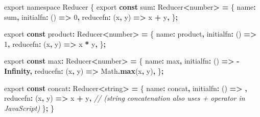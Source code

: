 \documentclass[
  openany]{book}
\newenvironment{Shaded}{\begin{snugshade}}{\end{snugshade}}
\newcommand{\BuiltInTok}[1]{#1}
\newcommand{\CommentTok}[1]{\textcolor[rgb]{0.56,0.35,0.01}{\textit{#1}}}
\newcommand{\DataTypeTok}[1]{\textcolor[rgb]{0.13,0.29,0.53}{#1}}
\newcommand{\DecValTok}[1]{\textcolor[rgb]{0.00,0.00,0.81}{#1}}
\newcommand{\FunctionTok}[1]{\textcolor[rgb]{0.13,0.29,0.53}{\textbf{#1}}}
\newcommand{\ImportTok}[1]{#1}
\newcommand{\KeywordTok}[1]{\textcolor[rgb]{0.13,0.29,0.53}{\textbf{#1}}}
\newcommand{\NormalTok}[1]{#1}
\newcommand{\OperatorTok}[1]{\textcolor[rgb]{0.81,0.36,0.00}{\textbf{#1}}}
\newcommand{\VerbatimStringTok}[1]{\textcolor[rgb]{0.31,0.60,0.02}{#1}}
\theoremstyle{definition}
\theoremstyle{definition}
\theoremstyle{definition}
\theoremstyle{definition}
\theoremstyle{remark}
\begin{document}
\begin{Shaded}
\begin{Highlighting}[]
\ImportTok{export} \ImportTok{namespace} \DataTypeTok{Reducer}\NormalTok{ \{}
  \ImportTok{export} \KeywordTok{const}\NormalTok{ sum}\OperatorTok{:}\NormalTok{ Reducer}\OperatorTok{\textless{}}\DataTypeTok{number}\OperatorTok{\textgreater{}} \OperatorTok{=}\NormalTok{ \{}
\NormalTok{    name}\OperatorTok{:} \VerbatimStringTok{\textasciigrave{}sum\textasciigrave{}}\OperatorTok{,}
\NormalTok{    initialfn}\OperatorTok{:}\NormalTok{ () }\KeywordTok{=\textgreater{}} \DecValTok{0}\OperatorTok{,}
\NormalTok{    reducefn}\OperatorTok{:}\NormalTok{ (x}\OperatorTok{,}\NormalTok{ y) }\KeywordTok{=\textgreater{}}\NormalTok{ x }\OperatorTok{+}\NormalTok{ y}\OperatorTok{,}
\NormalTok{  \}}\OperatorTok{;}

  \ImportTok{export} \KeywordTok{const}\NormalTok{ product}\OperatorTok{:}\NormalTok{ Reducer}\OperatorTok{\textless{}}\DataTypeTok{number}\OperatorTok{\textgreater{}} \OperatorTok{=}\NormalTok{ \{}
\NormalTok{    name}\OperatorTok{:} \VerbatimStringTok{\textasciigrave{}product\textasciigrave{}}\OperatorTok{,}
\NormalTok{    initialfn}\OperatorTok{:}\NormalTok{ () }\KeywordTok{=\textgreater{}} \DecValTok{1}\OperatorTok{,}
\NormalTok{    reducefn}\OperatorTok{:}\NormalTok{ (x}\OperatorTok{,}\NormalTok{ y) }\KeywordTok{=\textgreater{}}\NormalTok{ x }\OperatorTok{*}\NormalTok{ y}\OperatorTok{,}
\NormalTok{  \}}\OperatorTok{;}

  \ImportTok{export} \KeywordTok{const}\NormalTok{ max}\OperatorTok{:}\NormalTok{ Reducer}\OperatorTok{\textless{}}\DataTypeTok{number}\OperatorTok{\textgreater{}} \OperatorTok{=}\NormalTok{ \{}
\NormalTok{    name}\OperatorTok{:} \VerbatimStringTok{\textasciigrave{}max\textasciigrave{}}\OperatorTok{,}
\NormalTok{    initialfn}\OperatorTok{:}\NormalTok{ () }\KeywordTok{=\textgreater{}} \OperatorTok{{-}}\KeywordTok{Infinity}\OperatorTok{,}
\NormalTok{    reducefn}\OperatorTok{:}\NormalTok{ (x}\OperatorTok{,}\NormalTok{ y) }\KeywordTok{=\textgreater{}} \BuiltInTok{Math}\OperatorTok{.}\FunctionTok{max}\NormalTok{(x}\OperatorTok{,}\NormalTok{ y)}\OperatorTok{,}
\NormalTok{  \}}\OperatorTok{;}

  \ImportTok{export} \KeywordTok{const}\NormalTok{ concat}\OperatorTok{:}\NormalTok{ Reducer}\OperatorTok{\textless{}}\DataTypeTok{string}\OperatorTok{\textgreater{}} \OperatorTok{=}\NormalTok{ \{}
\NormalTok{    name}\OperatorTok{:} \VerbatimStringTok{\textasciigrave{}concat\textasciigrave{}}\OperatorTok{,}
\NormalTok{    initialfn}\OperatorTok{:}\NormalTok{ () }\KeywordTok{=\textgreater{}} \VerbatimStringTok{\textasciigrave{}\textasciigrave{}}\OperatorTok{,}
\NormalTok{    reducefn}\OperatorTok{:}\NormalTok{ (x}\OperatorTok{,}\NormalTok{ y) }\KeywordTok{=\textgreater{}}\NormalTok{ x }\OperatorTok{+}\NormalTok{ y}\OperatorTok{,}
    \CommentTok{// (string concatenation also uses \textasciigrave{}+\textasciigrave{} operator in JavaScript)}
\NormalTok{  \}}\OperatorTok{;}
\NormalTok{\}}
\end{Highlighting}
\end{Shaded}
\end{document}
